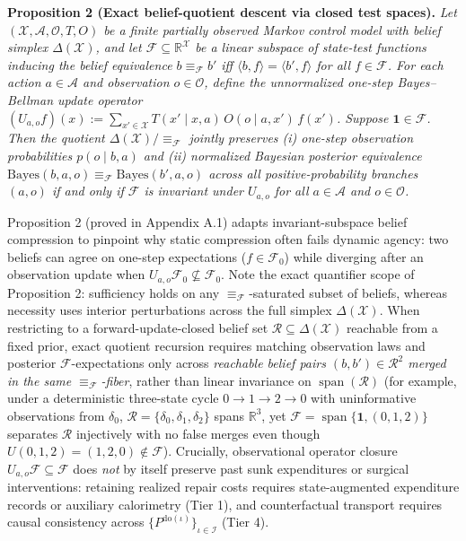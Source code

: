 \documentclass[11pt,a4paper]{article}
\begin{document}
\textbf{Proposition 2 (Exact belief-quotient descent via closed test
spaces).} \emph{Let \((\mathcal{X}, \mathcal{A}, \mathcal{O}, T, O)\) be
a finite partially observed Markov control model with belief simplex
\(\Delta(\mathcal{X})\), and let
\(\mathcal{F} \subseteq \mathbb{R}^{\mathcal{X}}\) be a linear subspace
of state-test functions inducing the belief equivalence
\(b \equiv_{\mathcal{F}} b'\) iff
\(\langle b, f\rangle = \langle b', f\rangle\) for all
\(f \in \mathcal{F}\). For each action \(a \in \mathcal{A}\) and
observation \(o \in \mathcal{O}\), define the unnormalized one-step
Bayes--Bellman update operator
\((U_{a,o} f)(x) := \sum_{x' \in \mathcal{X}} T(x' \mid x, a)\, O(o \mid a, x')\, f(x')\).
Suppose \(\mathbf{1} \in \mathcal{F}\). Then the quotient
\(\Delta(\mathcal{X})/{\equiv_{\mathcal{F}}}\) jointly preserves (i)
one-step observation probabilities \(p(o \mid b, a)\) and (ii)
normalized Bayesian posterior equivalence
\(\mathrm{Bayes}(b,a,o) \equiv_{\mathcal{F}} \mathrm{Bayes}(b',a,o)\)
across all positive-probability branches \((a,o)\) if and only if
\(\mathcal{F}\) is invariant under \(U_{a,o}\) for all
\(a \in \mathcal{A}\) and \(o \in \mathcal{O}\).}

Proposition 2 (proved in Appendix A.1) adapts invariant-subspace belief
compression \citep{poupartBoutilier2003} to pinpoint why static
compression often fails dynamic agency: two beliefs can agree on
one-step expectations (\(f \in \mathcal{F}_0\)) while diverging after an
observation update when
\(U_{a,o}\mathcal{F}_0 \not\subseteq \mathcal{F}_0\). Note the exact
quantifier scope of Proposition 2: sufficiency holds on any
\(\equiv_{\mathcal{F}}\)-saturated subset of beliefs, whereas necessity
uses interior perturbations across the full simplex
\(\Delta(\mathcal{X})\). When restricting to a forward-update-closed
belief set \(\mathcal{R} \subseteq \Delta(\mathcal{X})\) reachable from
a fixed prior, exact quotient recursion requires matching observation
laws and posterior \(\mathcal{F}\)-expectations only across
\emph{reachable belief pairs \((b, b') \in \mathcal{R}^2\) merged in the
same \(\equiv_{\mathcal{F}}\)-fiber}, rather than linear invariance on
\(\operatorname{span}(\mathcal{R})\) (for example, under a deterministic
three-state cycle \(0 \to 1 \to 2 \to 0\) with uninformative
observations from \(\delta_0\),
\(\mathcal{R} = \{\delta_0, \delta_1, \delta_2\}\) spans
\(\mathbb{R}^3\), yet
\(\mathcal{F} = \operatorname{span}\{\mathbf{1}, (0,1,2)\}\) separates
\(\mathcal{R}\) injectively with no false merges even though
\(U(0,1,2) = (1,2,0) \notin \mathcal{F}\)). Crucially, observational
operator closure \(U_{a,o}\mathcal{F} \subseteq \mathcal{F}\) does
\emph{not} by itself preserve past sunk expenditures or surgical
interventions: retaining realized repair costs requires state-augmented
expenditure records or auxiliary calorimetry (Tier 1), and
counterfactual transport requires causal consistency across
\(\{P^{\mathrm{do}(\iota)}\}_{\iota \in \mathcal{I}}\) (Tier 4).
\end{document}
